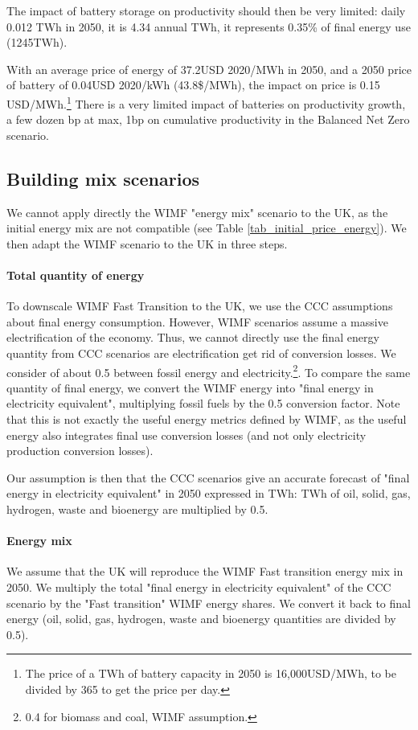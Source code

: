 The impact of battery storage on productivity should then be very limited: daily 0.012 TWh in 2050, it is 4.34 annual TWh, it represents 0.35\% of final energy use (1245TWh). 

With an average price of energy of 37.2USD 2020/MWh in 2050, and a 2050 price of battery of 0.04USD 2020/kWh (43.8\$/MWh), the impact on price is 0.15 USD/MWh.\footnote{The price of a TWh of battery capacity in 2050 is 16,000USD/MWh, to be divided by 365 to get the price per day.} There is a very limited impact of batteries on productivity growth, a few dozen bp at max, 1bp on cumulative productivity in the Balanced Net Zero scenario. 


\subsection{Building mix scenarios}
\label{section_UK_WIMF_scenario}

We cannot apply directly the WIMF "energy mix" scenario to the UK, as the initial energy mix are not compatible (see Table \ref{tab_initial_price_energy}). We then adapt the WIMF scenario to the UK in three steps. 

\paragraph{Total quantity of energy} To downscale WIMF Fast Transition to the UK, we use the CCC assumptions about final energy consumption. However, WIMF scenarios assume a massive electrification of the economy. Thus, we cannot directly use the final energy quantity from CCC scenarios are electrification get rid of conversion losses. We consider of about 0.5 between fossil energy and electricity.\footnote{0.4 for biomass and coal, WIMF assumption.}. 
To compare the same quantity of final energy, we convert the WIMF energy into "final energy in electricity equivalent", multiplying fossil fuels by the 0.5 conversion factor. Note that this is not exactly the useful energy metrics defined by WIMF, as the useful energy also integrates final use conversion losses (and not only electricity production conversion losses). 

Our assumption is then that the CCC scenarios give an accurate forecast of "final energy in electricity equivalent" in 2050 expressed in TWh: TWh of oil, solid, gas, hydrogen, waste and bioenergy are multiplied by 0.5. 

\paragraph{Energy mix} We assume that the UK will reproduce the WIMF Fast transition energy mix in 2050. We multiply the total "final energy in electricity equivalent" of the CCC scenario by the "Fast transition" WIMF energy shares. We convert it back to final energy (oil, solid, gas, hydrogen, waste and bioenergy quantities are divided by 0.5). 

